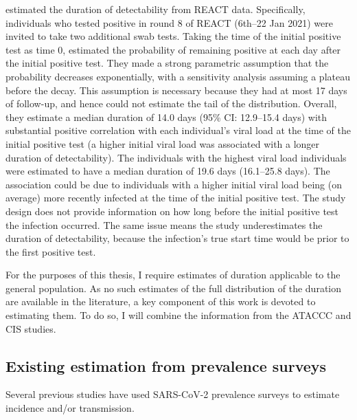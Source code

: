 \documentclass[thesis.tex]{subfiles}
\begin{document}
\Textcite{ealesCharacterising} estimated the duration of detectability from REACT data.
Specifically, individuals who tested positive in round 8 of REACT (6th--22 Jan 2021) were invited to take two additional swab tests.
Taking the time of the initial positive test as time 0, \textcite{ealesCharacterising} estimated the probability of remaining positive at each day after the initial positive test.
They made a strong parametric assumption that the probability decreases exponentially, with a sensitivity analysis assuming a plateau before the decay.
This assumption is necessary because they had at most 17 days of follow-up, and hence could not estimate the tail of the distribution.
Overall, they estimate a median duration of 14.0 days (95\% CI: 12.9--15.4 days) with substantial positive correlation with each individual’s viral load at the time of the initial positive test (\ie a higher initial viral load was associated with a longer duration of detectability).
The individuals with the highest viral load individuals were estimated to have a median duration of 19.6 days (16.1--25.8 days).
The association could be due to individuals with a higher initial viral load being (on average) more recently infected at the time of the initial positive test.
The study design does not provide information on how long before the initial positive test the infection occurred.
The same issue means the study underestimates the duration of detectability, because the infection's true start time would be prior to the first positive test.

For the purposes of this thesis, I require estimates of duration applicable to the general population.
As no such estimates of the full distribution of the duration are available in the literature, a key component of this work is devoted to estimating them.
To do so, I will combine the information from the ATACCC and CIS studies.


\subsection{Existing estimation from prevalence surveys}

Several previous studies have used SARS-CoV-2 prevalence surveys to estimate incidence and/or transmission.
\end{document}
